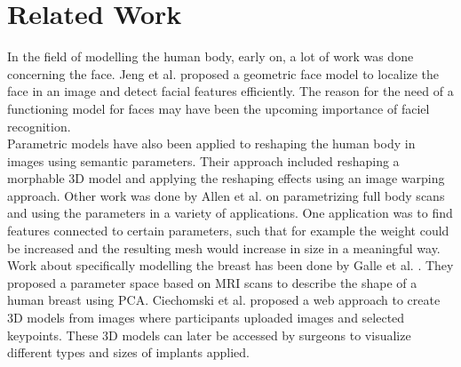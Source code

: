 \setcounter{chapter}{1}

\chapter{Related Work}
In the field of modelling the human body, early on, a lot of work was done concerning the face. Jeng et al. \cite{jeng1998facial} proposed a geometric face model to localize the face in an image and detect facial features efficiently. The reason for the need of a functioning model for faces may have been the upcoming importance of faciel recognition.\\
Parametric models have also been applied to reshaping the human body in images using semantic parameters. \cite{zhou2010parametric} Their approach included reshaping a morphable 3D model and applying the reshaping effects using an image warping approach. Other work was done by Allen et al. \cite{allen2003space} on parametrizing full body scans and using the parameters in a variety of applications. One application was to find features connected to certain parameters, such that for example the weight could be increased and the resulting mesh would increase in size in a meaningful way.\\
Work about specifically modelling the breast has been done by Galle et al. \cite{gallo2010human}. They proposed a parameter space based on MRI scans to describe the shape of a human breast using PCA. Ciechomski et al. \cite{de2012development} proposed a web approach to create 3D models from images where participants uploaded images and selected keypoints. These 3D models can later be accessed by surgeons to visualize different types and sizes of implants applied.
